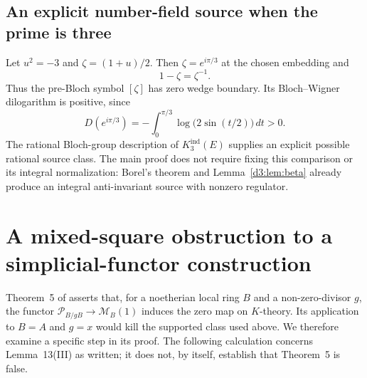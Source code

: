 \documentclass[11pt,a4paper]{amsart}
\numberwithin{equation}{section}
\theoremstyle{definition}
\theoremstyle{remark}
\begin{document}
\subsection{An explicit number-field source when the prime is three}
Let $u^2=-3$ and $\zeta=(1+u)/2$. Then $\zeta=e^{i\pi/3}$ at the chosen embedding and
\[
1-\zeta=\zeta^{-1}.
\]
Thus the pre-Bloch symbol $[\zeta]$ has zero wedge boundary. Its Bloch--Wigner dilogarithm is positive, since
\[
D(e^{i\pi/3})=-\int_0^{\pi/3}\log\bigl(2\sin(t/2)\bigr)\,dt>0.
\]
The rational Bloch-group description of $K_3^{\mathrm{ind}}(E)$ \cite[VI, Theorem~5.2]{Weibel} supplies an explicit possible rational source class. The main proof does not require fixing this comparison or its integral normalization: Borel's theorem and Lemma~\ref{d3:lem:beta} already produce an integral anti-invariant source with nonzero regulator.

\section{A mixed-square obstruction to a simplicial-functor construction}
\label{d3:sec:mochizukisquare}

Theorem~5 of \cite{MochizukiParameters} asserts that, for a noetherian
local ring $B$ and a non-zero-divisor $g$, the functor
$\mathcal P_{B/gB}\to\mathcal M_B(1)$ induces the zero map on
$K$-theory. Its application to $B=A$ and $g=x$ would kill the supported
class used above. We therefore examine a specific step in its proof.
The following calculation concerns Lemma~13(III) as written; it does
not, by itself, establish that Theorem~5 is false.
\end{document}
